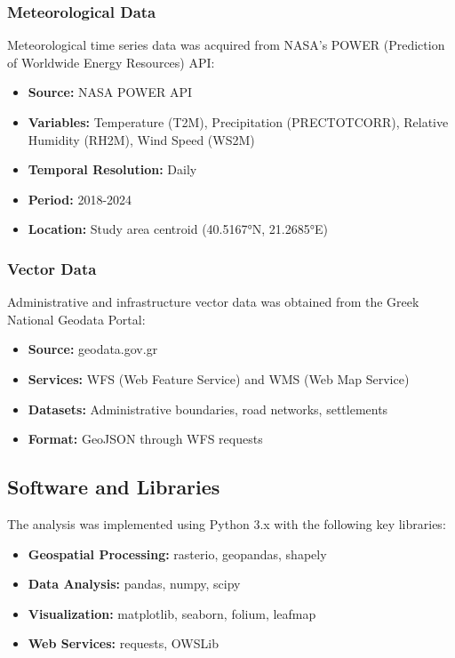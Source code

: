 \documentclass[a4paper,12pt]{article}
\begin{document}
\subsubsection{Meteorological Data}

Meteorological time series data was acquired from NASA's POWER (Prediction of
Worldwide Energy Resources) API:

\begin{itemize}
    \item \textbf{Source:} NASA POWER API
    \item \textbf{Variables:} Temperature (T2M), Precipitation (PRECTOTCORR), Relative Humidity (RH2M), Wind Speed (WS2M)
    \item \textbf{Temporal Resolution:} Daily
    \item \textbf{Period:} 2018-2024
    \item \textbf{Location:} Study area centroid (40.5167°N, 21.2685°E)
\end{itemize}

\subsubsection{Vector Data}

Administrative and infrastructure vector data was obtained from the Greek
National Geodata Portal:

\begin{itemize}
    \item \textbf{Source:} geodata.gov.gr
    \item \textbf{Services:} WFS (Web Feature Service) and WMS (Web Map Service)
    \item \textbf{Datasets:} Administrative boundaries, road networks, settlements
    \item \textbf{Format:} GeoJSON through WFS requests
\end{itemize}

\subsection{Software and Libraries}

The analysis was implemented using Python 3.x with the following key libraries:

\begin{itemize}
    \item \textbf{Geospatial Processing:} rasterio, geopandas, shapely
    \item \textbf{Data Analysis:} pandas, numpy, scipy
    \item \textbf{Visualization:} matplotlib, seaborn, folium, leafmap
    \item \textbf{Web Services:} requests, OWSLib
\end{itemize}
\end{document}
